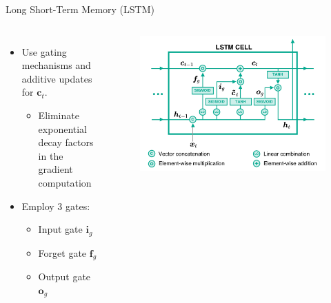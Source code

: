 \documentclass[Nike]{tuberlinbeamer}
\newcommand{\pvec}[1]{\boldsymbol{#1}}
\begin{document}
\begin{frame}{Long Short-Term Memory (LSTM) \cite{Hochreiter:1997:LSM:265493.264179}}
\begin{columns}
\begin{itemize}
	\item<1-> Use gating mechanisms and additive updates for $\pvec{c}_t$.
		\begin{itemize}
			\item Eliminate exponential decay factors in the gradient computation
		\end{itemize}
	\item<2-> Employ 3 gates:
		\begin{itemize}
			\item Input gate $\pvec{i}_g$
			\item Forget gate $\pvec{f}_g$
			\item Output gate $\pvec{o}_g$
		\end{itemize}
\end{itemize}
 \begin{figure}[h]
\includegraphics [width=\textwidth]{figures/lstm}
\end{figure}

\end{columns}

\end{frame}
\end{document}

